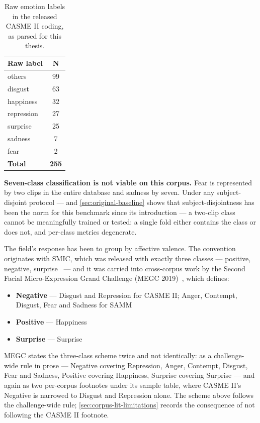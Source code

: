 \begin{table}[htbp]
	\centering
	\begin{tabular}{l c}
		\hline
		\textbf{Raw label} & \textbf{N} \\
		\hline
		others     & 99 \\
		disgust    & 63 \\
		happiness  & 32 \\
		repression & 27 \\
		surprise   & 25 \\
		sadness    & 7 \\
		fear       & 2 \\
		\hline
		\textbf{Total} & \textbf{255} \\
		\hline
	\end{tabular}
	\caption[Raw emotion labels in the released CASME II coding]{Raw emotion labels in the released CASME II coding, as parsed for this thesis.}
	\label{tab:casme2-raw-labels}
\end{table}

\textbf{Seven-class classification is not viable on this corpus.} Fear is represented by two clips in the entire database and sadness by seven. Under any subject-disjoint protocol --- and \autoref{sec:original-baseline} shows that subject-disjointness has been the norm for this benchmark since its introduction --- a two-clip class cannot be meaningfully trained or tested: a single fold either contains the class or does not, and per-class metrics degenerate.

The field's response has been to group by affective valence. The convention originates with SMIC, which was released with exactly three classes --- positive, negative, surprise~\cite{liX2013} --- and it was carried into cross-corpus work by the Second Facial Micro-Expression Grand Challenge (MEGC 2019)~\cite{see2019}, which defines:

\begin{itemize}
	\item \textbf{Negative} --- Disgust and Repression for CASME II; Anger, Contempt, Disgust, Fear and Sadness for SAMM
	\item \textbf{Positive} --- Happiness
	\item \textbf{Surprise} --- Surprise
\end{itemize}

MEGC states the three-class scheme twice and not identically: as a challenge-wide rule in prose --- Negative covering Repression, Anger, Contempt, Disgust, Fear and Sadness, Positive covering Happiness, Surprise covering Surprise --- and again as two per-corpus footnotes under its sample table, where CASME II's Negative is narrowed to Disgust and Repression alone. The scheme above follows the challenge-wide rule; \autoref{sec:corpus-lit-limitations} records the consequence of not following the CASME II footnote.

